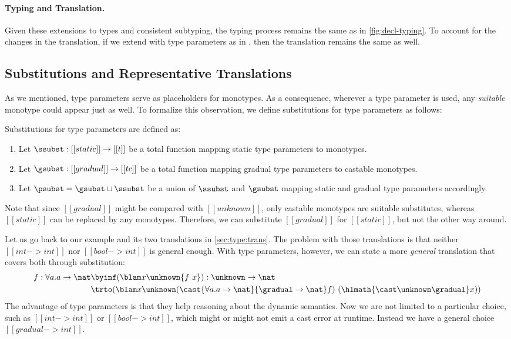 \paragraph{Typing and Translation.}

Given these extensions to types and consistent subtyping, the typing process
remains the same as in \cref{fig:decl-typing}. To account for the
changes in the translation, if we extend \pbc with type parameters as in
\citet{garcia2015principal}, then the translation remains the same as well.

\subsection{Substitutions and Representative Translations}

As we mentioned, type parameters serve as placeholders for monotypes. As a
consequence, wherever a type parameter is used, any \emph{suitable} monotype
could appear just as well. To formalize this observation, we define substitutions for type
parameters as follows:

\begin{definition}[Substitution] Substitutions for type parameters are defined as:
  \begin{enumerate}
    \item Let $\ssubst : [[static]] \to [[t]]$ be a total function mapping static type
      parameters to monotypes. 
    \item Let $\gsubst : [[gradual]] \to [[tc]]$ be a total function mapping gradual type
      parameters to castable monotypes.
    \item Let $\psubst = \gsubst \cup \ssubst$ be a union of $\ssubst$ and $\gsubst$ mapping static and gradual
      type parameters accordingly.
  \end{enumerate}
\end{definition}
\noindent Note that since $[[gradual]]$ might be compared with $[[unknown]]$, only
castable monotypes are suitable substitutes, whereas $[[static]]$
can be replaced by any monotypes. Therefore, we can substitute $[[gradual]]$ for $[[static]]$,
but not the other way around.


Let us go back to our example and its two translations in \cref{sec:type:trans}. The
problem with those translations is that neither $[[int -> int]]$ nor $[[bool ->
int]]$ is general enough. With type parameters, however, we can state a more
\textit{general} translation that covers both through substitution:
\begin{align*}
  f: \forall a. a \to \nat &\byinf (\blam x \unknown {f ~ x})
                          : \unknown \to \nat \\
                          &\trto (\blam x \unknown (\cast {\forall a. a \to \nat} {\gradual \to \nat} f) ~
                          (\hlmath{\cast \unknown \gradual} x))
\end{align*}
The advantage of type parameters is that they help reasoning
about the dynamic semantics. Now we are not limited to a particular choice, such
as $[[int -> int]]$ or $[[bool -> int]]$, which might or might not emit a cast
error at runtime. Instead we have a general choice $[[gradual ->
int]]$. 

